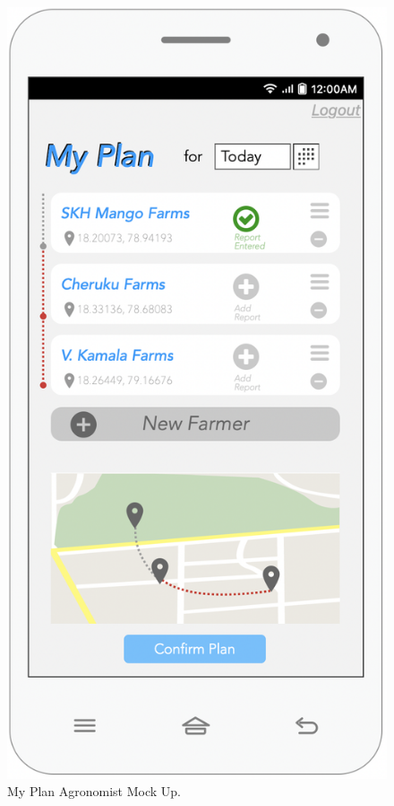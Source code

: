 \begin{multicols}{3}
 
\begin{figure}[H]

 \centering
\includegraphics[scale=0.35]{../images_diagrams/mock_ups/myplan100.png}
\caption{\label{fig:mock_plan}My Plan Agronomist Mock Up.}
 \end{figure}
 

\end{multicols}
